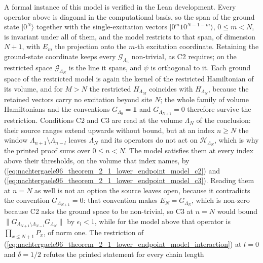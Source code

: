 \documentclass{article}
\begin{document}
A formal instance of this model is verified in the Lean development. Every
operator above is diagonal in the computational basis, so the span of the
ground state $\lvert0^N\rangle$ together with the single-excitation vectors
$\lvert0^m10^{N-1-m}\rangle$, $0\leq m<N$, is invariant under all of them, and
the model restricts to that span, of dimension $N+1$, with $E_m$ the
projection onto the $m$-th excitation coordinate. Retaining the ground-state
coordinate keeps every $\mathcal G_{\Lambda_n}$ non-trivial, as C2 requires;
on the restricted space $\mathcal G_{\Lambda_N}$ is the line it spans, and
$\psi$ is orthogonal to it. Each ground space of the restricted model is again
the kernel of the restricted Hamiltonian of its volume, and for $M>N$ the
restricted $H_{\Lambda_M}$ coincides with $H_{\Lambda_N}$, because the
retained vectors carry no excitation beyond site $N$; the whole family of
volume Hamiltonians and the conventions $G_{\Lambda_0}=\mathbf 1$ and
$G_{\Lambda_{N+1}}=0$ therefore survive the restriction. Conditions C2 and C3
are read at the volume $\Lambda_N$ of the conclusion: their source ranges
extend upwards without bound, but at an index $n\geq N$ the window
$\Lambda_{n+1}\setminus\Lambda_{n-l}$ leaves $\Lambda_N$ and its operators do
not act on $\mathcal H_{\Lambda_N}$, which is why the printed proof sums over
$0\leq n<N$. The model satisfies them at every index above their thresholds,
on the volume that index names, by
(\ref{eq:nachtergaele96_theorem_2_1_lower_endpoint_model_c2}) and
(\ref{eq:nachtergaele96_theorem_2_1_lower_endpoint_model_c3}). Reading them at
$n=N$ as well is not an option the source leaves open, because it contradicts
the convention $G_{\Lambda_{N+1}}=0$: that convention makes
$E_N=G_{\Lambda_N}$, which is non-zero because C2 asks the ground space to be
non-trivial, so C3 at $n=N$ would bound
$\lVert G_{\Lambda_{N+1}\setminus\Lambda_{N-l}}G_{\Lambda_N}\rVert$ by
$\epsilon_l<1$, while for the model above that operator is
$\prod_{x\leq N+1}P_x$, of norm one. The restriction of
(\ref{eq:nachtergaele96_theorem_2_1_lower_endpoint_model_interaction}) at
$l=0$ and $\delta=1/2$ refutes the printed statement for every chain length
\end{document}
